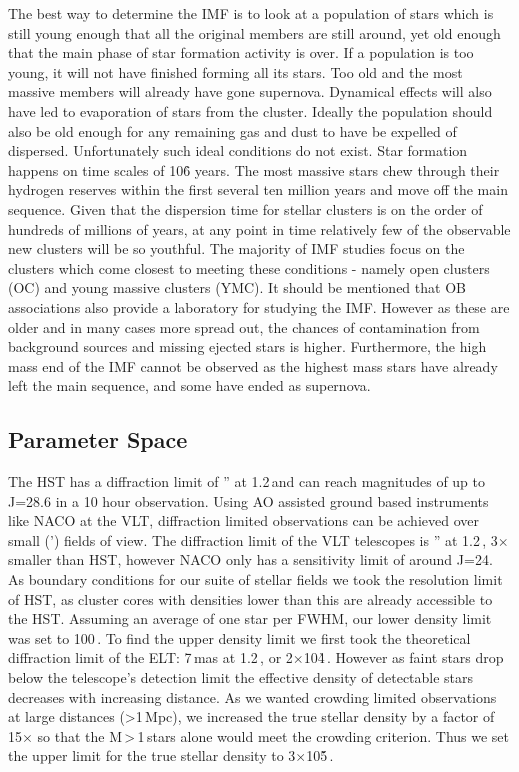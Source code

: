 The best way to determine the IMF is to look at a population of stars which is still young enough that all the original members are still around, yet old enough that the main phase of star formation activity is over. If a population is too young, it will not have finished forming all its stars. Too old and the most massive members will already have gone supernova. Dynamical effects will also have led to evaporation of stars from the cluster. Ideally the population should also be old enough for any remaining gas and dust to have be expelled of dispersed. Unfortunately such ideal conditions do not exist. Star formation happens on time scales of 10\h6 years. The most massive stars chew through their hydrogen reserves within the first several ten million years and move off the main sequence. Given that the dispersion time for stellar clusters is on the order of hundreds of millions of years, at any point in time relatively few of the observable new clusters will be so youthful. The majority of IMF studies focus on the clusters which come closest to meeting these conditions - namely open clusters (OC) and young massive clusters (YMC). It should be mentioned that OB associations also provide a laboratory for studying the IMF. However as these are older and in many cases more spread out, the chances of contamination from background sources and missing ejected stars is higher. Furthermore, the high mass end of the IMF cannot be observed as the highest mass stars have already left the main sequence, and some have ended as supernova.


\subsection{Parameter Space}

The HST has a diffraction limit of '' at 1.2\,\um and can reach magnitudes of up to J=28.6\m \citep{hst_wfc3} in a 10 hour observation. Using AO assisted ground based instruments like NACO at the VLT, diffraction limited observations can be achieved over small (') fields of view. The diffraction limit of the VLT telescopes is '' at 1.2\,\um, 3$\times$ smaller than HST, however NACO only has a sensitivity limit of around J=24\m. As boundary conditions for our suite of stellar fields we took the resolution limit of HST, as cluster cores with densities lower than this are already accessible to the HST. Assuming an average of one star per FWHM, our lower density limit was set to 100\,\spa. To find the upper density limit we first took the theoretical diffraction limit of the ELT: 7\,mas at 1.2\,\ume, or 2$\times$10\h4\,\spa. However as faint stars drop below the telescope's detection limit the effective density of detectable stars decreases with increasing distance. As we wanted crowding limited observations at large distances (\textgreater1\,Mpc), we increased the true stellar density by a factor of 15$\times$ so that the M\,\textgreater\,1\,\msun stars alone would meet the crowding criterion. Thus we set the upper limit for the true stellar density to 3$\times$10\h5\,\spa.

